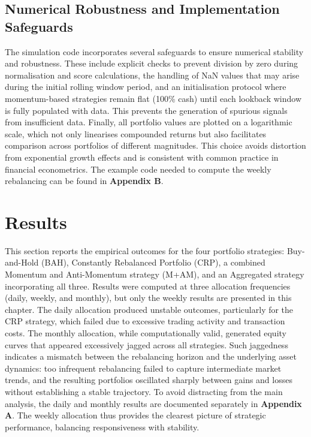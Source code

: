\documentclass[12pt,a4paper]{report}
\begin{document}
\section{Numerical Robustness and Implementation Safeguards}
\label{sec:robustness}

The simulation code incorporates several safeguards to ensure numerical stability and robustness. These include explicit checks to prevent division by zero during normalisation and score calculations, the handling of NaN values that may arise during the initial rolling window period, and an initialisation protocol where momentum-based strategies remain flat (100\% cash) until each lookback window is fully populated with data. This prevents the generation of spurious signals from insufficient data. Finally, all portfolio values are plotted on a logarithmic scale, which not only linearises compounded returns but also facilitates comparison across portfolios of different magnitudes. This choice avoids distortion from exponential growth effects and is consistent with common practice in financial econometrics. The example code needed to compute the weekly rebalancing can be found in \textbf{Appendix B}.

\chapter{Results}

This section reports the empirical outcomes for the four portfolio strategies: Buy-and-Hold (BAH), Constantly Rebalanced Portfolio (CRP), a combined Momentum and Anti-Momentum strategy (M+AM), and an Aggregated strategy incorporating all three. Results were computed at three allocation frequencies (daily, weekly, and monthly), but only the weekly results are presented in this chapter. The daily allocation produced unstable outcomes, particularly for the CRP strategy, which failed due to excessive trading activity and transaction costs. The monthly allocation, while computationally valid, generated equity curves that appeared excessively jagged across all strategies. Such jaggedness indicates a mismatch between the rebalancing horizon and the underlying asset dynamics: too infrequent rebalancing failed to capture intermediate market trends, and the resulting portfolios oscillated sharply between gains and losses without establishing a stable trajectory. To avoid distracting from the main analysis, the daily and monthly results are documented separately in \textbf{Appendix A}. The weekly allocation thus provides the clearest picture of strategic performance, balancing responsiveness with stability.  
\end{document}
